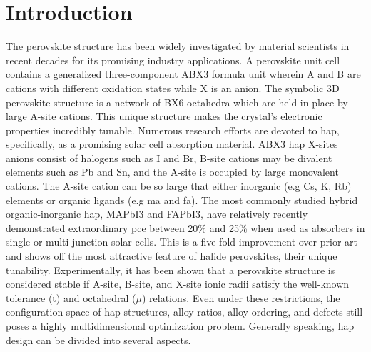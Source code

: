 \documentclass[twoside, twocolumn, 9pt, draft]{article}
\begin{document}
\renewcommand*\rmdefault{bch}\normalfont\upshape
\rmfamily
\section*{}
\vspace{-1cm}



\section*{Introduction}
\label{sec:org0d387a5}
The perovskite structure has been widely investigated by material
scientists in recent decades for its promising industry
applications. A perovskite unit cell contains a generalized
three-component ABX3 formula unit wherein A and B are cations with
different oxidation states while X is an anion. The symbolic 3D
perovskite structure is a network of BX6 octahedra which are held in
place by large A-site cations. This unique structure makes the
crystal's electronic properties incredibly tunable. Numerous research
efforts are devoted to \acrfull{hap}, specifically, as a
promising solar cell absorption
material\cite{ansari-2018-front-oppor,yin-2015-halid-perov,manser-2016-intrig-optoel,brenner-2016-hybrid-organ}. ABX3
\acrlong{hap} X-sites anions consist of halogens such as I and Br,
B-site cations may be divalent elements such as Pb and Sn, and the
A-site is occupied by large monovalent cations. The A-site cation can
be so large that either inorganic (e.g Cs, K, Rb) elements or organic
ligands (e.g \acrfull{ma} and \acrfull{fa}). The most
commonly studied hybrid organic-inorganic \acrlong{hap}, MAPbI3
and FAPbI3, have relatively recently demonstrated extraordinary \acrfull{pce} between 20\% and 25\% when used as absorbers
in single or multi junction solar
cells\cite{cui-2019-planar-p,jeong-2020-stabl-perov}. This is a five
fold improvement over prior art and shows off the most attractive
feature of halide perovskites, their unique
tunability. Experimentally, it has been shown that a perovskite
structure is considered stable if A-site, B-site, and X-site ionic
radii satisfy the well-known tolerance (t) and octahedral (\(\mu\))
relations\cite{bartel-2019-new-toler}. Even under these restrictions, the configuration space
of \acrshort{hap} structures, alloy ratios, alloy ordering, and defects still
poses a highly multidimensional optimization problem.  Generally
speaking, \acrlong{hap} design can be divided into several
aspects.
\end{document}
